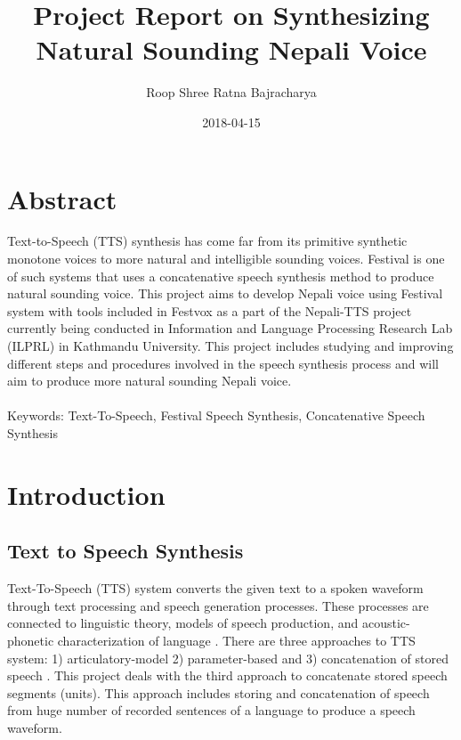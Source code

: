 \documentclass{article}
\title{Project Report on Synthesizing Natural Sounding Nepali Voice}
\date{2018-04-15}
\author{Roop Shree Ratna Bajracharya}
\begin{document}
	
	\maketitle
	\newpage

	\tableofcontents
	\newpage

	
	\section{Abstract}
	Text-to-Speech (TTS) synthesis has come far from its primitive synthetic monotone voices to more natural and intelligible sounding voices. Festival is one of such systems that uses a concatenative speech synthesis method to produce natural sounding voice. This project aims to develop Nepali voice using Festival system with tools included in Festvox as a part of the Nepali-TTS project currently being conducted in Information and Language Processing Research Lab (ILPRL) in Kathmandu University. This project includes studying and improving different steps and procedures involved in the speech synthesis process and will aim to produce more natural sounding Nepali voice.
	\paragraph{}
	Keywords: Text-To-Speech, Festival Speech Synthesis, Concatenative Speech Synthesis
	\newpage
	
	\section{Introduction}
	\subsection{Text to Speech Synthesis}
	Text-To-Speech (TTS) system converts the given text to a spoken waveform through text processing and speech generation processes. These processes are connected to linguistic theory, models of speech production, and acoustic-phonetic characterization of language \cite{ReviewOfTTS:1}. There are three approaches to TTS system: 1) articulatory-model 2) parameter-based  and 3) concatenation of stored speech \cite{ReviewOfTTS:1}. This project deals with the third approach to concatenate stored speech segments (units). This approach includes storing and concatenation of speech from huge number of recorded sentences of a language to produce a speech waveform. 


	\newpage
	
	
\end{document}
